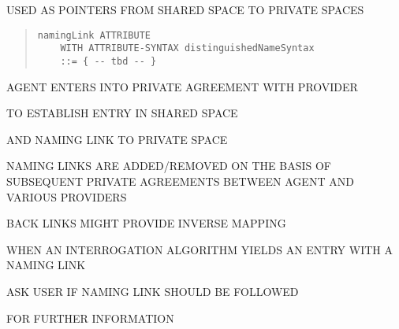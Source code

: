 \begin{bwslide}

\begin{nrtc}
\item	USED AS POINTERS FROM SHARED SPACE TO PRIVATE SPACES
\begin{quote}\begin{verbatim}
namingLink ATTRIBUTE
    WITH ATTRIBUTE-SYNTAX distinguishedNameSyntax
    ::= { -- tbd -- }
\end{verbatim}\end{quote}

\item	AGENT ENTERS INTO PRIVATE AGREEMENT WITH PROVIDER
    \begin{nrtc}
    \item	TO ESTABLISH ENTRY IN SHARED SPACE

    \item	AND NAMING LINK TO PRIVATE SPACE
    \end{nrtc}

\item	NAMING LINKS ARE ADDED/REMOVED ON THE BASIS OF SUBSEQUENT PRIVATE
	AGREEMENTS BETWEEN AGENT AND VARIOUS PROVIDERS

\item	BACK LINKS MIGHT PROVIDE INVERSE MAPPING
\end{nrtc}
\end{bwslide}


\begin{bwslide}

\begin{nrtc}
\item	WHEN AN INTERROGATION ALGORITHM YIELDS AN ENTRY WITH A NAMING LINK
    \begin{nrtc}
    \item	ASK USER IF NAMING LINK SHOULD BE FOLLOWED
    \end{nrtc}
    FOR FURTHER INFORMATION
\end{nrtc}
\end{bwslide}
